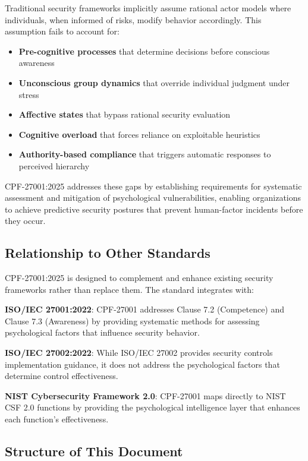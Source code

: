 \documentclass[11pt,a4paper]{article}
\begin{document}
Traditional security frameworks implicitly assume rational actor models where individuals, when informed of risks, modify behavior accordingly. This assumption fails to account for:

\begin{itemize}
\item \textbf{Pre-cognitive processes} that determine decisions before conscious awareness
\item \textbf{Unconscious group dynamics} that override individual judgment under stress
\item \textbf{Affective states} that bypass rational security evaluation
\item \textbf{Cognitive overload} that forces reliance on exploitable heuristics
\item \textbf{Authority-based compliance} that triggers automatic responses to perceived hierarchy
\end{itemize}

CPF-27001:2025 addresses these gaps by establishing requirements for systematic assessment and mitigation of psychological vulnerabilities, enabling organizations to achieve predictive security postures that prevent human-factor incidents before they occur.

\subsection{Relationship to Other Standards}

CPF-27001:2025 is designed to complement and enhance existing security frameworks rather than replace them. The standard integrates with:

\textbf{ISO/IEC 27001:2022}: CPF-27001 addresses Clause 7.2 (Competence) and Clause 7.3 (Awareness) by providing systematic methods for assessing psychological factors that influence security behavior.

\textbf{ISO/IEC 27002:2022}: While ISO/IEC 27002 provides security controls implementation guidance, it does not address the psychological factors that determine control effectiveness.

\textbf{NIST Cybersecurity Framework 2.0}: CPF-27001 maps directly to NIST CSF 2.0 functions by providing the psychological intelligence layer that enhances each function's effectiveness.

\subsection{Structure of This Document}
\end{document}
